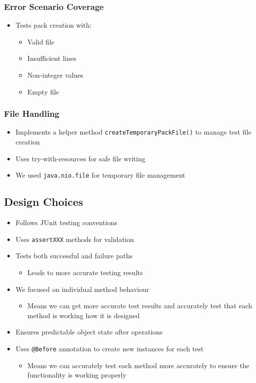 \documentclass{article}
\begin{document}
    \subsubsection{Error Scenario Coverage}
    \begin{itemize}
        \item Tests pack creation with:
        \begin{itemize}
            \item Valid file
            \item Insufficient lines
            \item Non-integer values
            \item Empty file
        \end{itemize}
    \end{itemize}

    \subsubsection{File Handling}
    \begin{itemize}
        \item Implements a helper method \texttt{createTemporaryPackFile()} to manage test file creation
        \item Uses try-with-resources for safe file writing
        \item We used \texttt{java.nio.file} for temporary file management
    \end{itemize}

    \subsection{Design Choices}
    \begin{itemize}
        \item Follows JUnit testing conventions
        \item Uses \texttt{assertXXX} methods for validation
        \item Tests both successful and failure paths
        \begin{itemize}
            \item Leads to more accurate testing results
        \end{itemize}
        \item We focused on individual method behaviour
        \begin{itemize}
            \item Means we can get more accurate test results and accurately test that each method is working how it is designed
        \end{itemize}
        \item Ensures predictable object state after operations
        \item Uses \texttt{@Before} annotation to create new instances for each test
        \begin{itemize}
            \item Means we can accurately test each method more accurately to ensure the functionality is working properly
        \end{itemize}
    \end{itemize}
\end{document}
